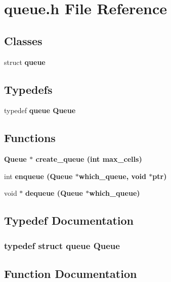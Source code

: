 \section{queue.h File Reference}
\label{queue_8h}
\subsection*{Classes}
\begin{CompactItemize}
\item 
struct \bf{queue}
\end{CompactItemize}
\subsection*{Typedefs}
\begin{CompactItemize}
\item 
typedef \bf{queue} \bf{Queue}
\end{CompactItemize}
\subsection*{Functions}
\begin{CompactItemize}
\item 
\bf{Queue} $\ast$ \bf{create\_\-queue} (int max\_\-cells)
\item 
int \bf{enqueue} (\bf{Queue} $\ast$which\_\-queue, void $\ast$ptr)
\item 
void $\ast$ \bf{dequeue} (\bf{Queue} $\ast$which\_\-queue)
\end{CompactItemize}


\subsection{Typedef Documentation}
\subsubsection{\setlength{\rightskip}{0pt plus 5cm}typedef struct \bf{queue} \bf{Queue}}\label{queue_8h_8560ae2ddf510ea6643f85a929bffa48}




\subsection{Function Documentation}
